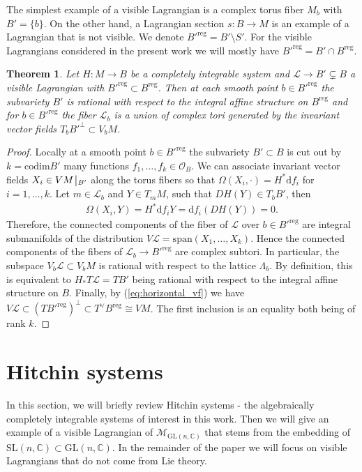 \documentclass[pdftex]{sigma}
\numberwithin{equation}{section}
\newtheorem{theo}{Theorem}[section]
\theoremstyle{definition}
\newcommand{\reg}{\mathrm{reg}}
\newcommand{\codim}{\mathrm{codim}}
\newcommand{\rest}{\: \rule[-3.5pt]{0.5pt}{11.5pt}\,{}}
\renewcommand{\to}{\rightarrow}
\newcommand{\calL}{\mathcal{L}}
\newcommand{\calM}{\mathcal{M}}
\newcommand{\calO}{\mathcal{O}}
\newcommand{\CC}{\mathbb{C}}
\newcommand{\GL}{\mathrm{GL}}
\newcommand{\SL}{\mathrm{SL}}
\begin{document}
The simplest example of a visible Lagrangian is a complex torus fiber $M_b$ with $B'=\{ b \}$. On the other hand, a Lagrangian section $s\colon B \to M$ is an example of a Lagrangian that is not visible. We denote $B'^{\reg}=B'\setminus S'$. For the visible Lagrangians considered in the present work we will mostly have $B'^\reg=B' \cap B^\reg$.

\begin{theo}\label{theo:visible_Lagr} Let $H\colon M \to B$ be a completely integrable system and $\calL \to B' \subsetneq B$ a visible Lagrangian with $B'^\reg \subset B^\reg$. Then at each smooth point $b \in B'^\reg$ the subvariety $B'$ is rational with respect to the integral affine structure on $B^\reg$ and for $b \in B'^\reg$ the fiber $\calL_b$ is a union of complex tori generated by the invariant vector fields $T_bB'^\perp \subset V_bM$.
\end{theo}
\begin{proof} Locally at a smooth point $b \in B'^\reg$ the subvariety $B' \subset B$ is cut out by $k=\codim B'$ many functions $f_1,\dots,f_k\in \calO_B$. We can associate invariant vector fields $X_i \in VM\rest_{B'}$ along the torus fibers so that $\Omega(X_i, \cdot)= H^* \mathrm{d} f_i$ for $i=1,\dots,k$. Let $m \in \calL_b$ and $Y \in T_mM$, such that $DH(Y) \in T_bB'$, then
 \begin{align} \Omega(X_i,Y)=H^*\mathrm{d}f_i Y=\mathrm{d}f_i(DH(Y)) = 0. \label{eq:horizontal_vf}
 \end{align}
 Therefore, the connected components of the fiber of $\calL$ over $b \in B'^\reg$ are integral submanifolds of the distribution $V\calL=\mathrm{span}(X_1, \dots, X_k)$. Hence the connected components of the fibers of $\calL_b \to B'^\reg$ are complex subtori. In particular, the subspace $V_b\calL \subset V_bM$ is rational with respect to the lattice $\Lambda_b$. By definition, this is equivalent to $H_*T\calL=TB'$ being rational with respect to the integral affine structure on $B$. Finally, by (\ref{eq:horizontal_vf}) we have $ V\calL \subset (TB'^\reg)^\perp \subset T^\vee B^\reg \cong VM$. The first inclusion is an equality both being of rank $k$.
\end{proof}

\section{Hitchin systems \label{sec:hitchin-systems}}
In this section, we will briefly review Hitchin systems - the algebraically completely integrable systems of interest in this work. Then we will give an example of a visible Lagrangian of $\calM_{\GL(n,\CC)}$ that stems from the embedding of $\SL(n,\CC) \subset \GL(n,\CC)$. In the remainder of the paper we will focus on visible Lagrangians that do not come from Lie theory.
\end{document}
